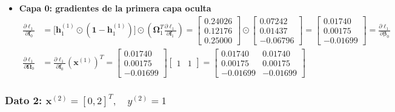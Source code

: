 \documentclass[10pt,a4paper]{article}
\begin{document}
\begin{itemize}
    \item \textbf{Capa 0: gradientes de la primera capa oculta}
    \begin{align*}
    \frac{\partial \ell_1}{\partial \mathbf{f}_0} &= \big[ \mathbf{h}_1^{(1)} \odot (\mathbf{1} - \mathbf{h}_1^{(1)}) \big] \odot \left( \boldsymbol{\Omega}_1^T \frac{\partial \ell_1}{\partial \mathbf{f}_1} \right) = \begin{bmatrix} 0.24026 \\ 0.12176 \\ 0.25000 \end{bmatrix} \odot \begin{bmatrix} 0.07242 \\ 0.01437 \\ -0.06796 \end{bmatrix} = \mathbf{\begin{bmatrix} 0.01740 \\ 0.00175 \\ -0.01699 \end{bmatrix}} = \frac{\partial \ell_1}{\partial \boldsymbol{\beta}_0} \\[0.1cm]
    \frac{\partial \ell_1}{\partial \boldsymbol{\Omega}_0} &= \frac{\partial \ell_1}{\partial \mathbf{f}_0} (\mathbf{x}^{(1)})^T = \begin{bmatrix} 0.01740 \\ 0.00175 \\ -0.01699 \end{bmatrix} \begin{bmatrix} 1 & 1 \end{bmatrix} = \mathbf{\begin{bmatrix} 0.01740 & 0.01740 \\ 0.00175 & 0.00175 \\ -0.01699 & -0.01699 \end{bmatrix}}
    \end{align*}
\end{itemize}

\subsubsection*{Dato 2: $\mathbf{x}^{(2)} = [0, 2]^T, \quad y^{(2)} = 1$}
\end{document}
